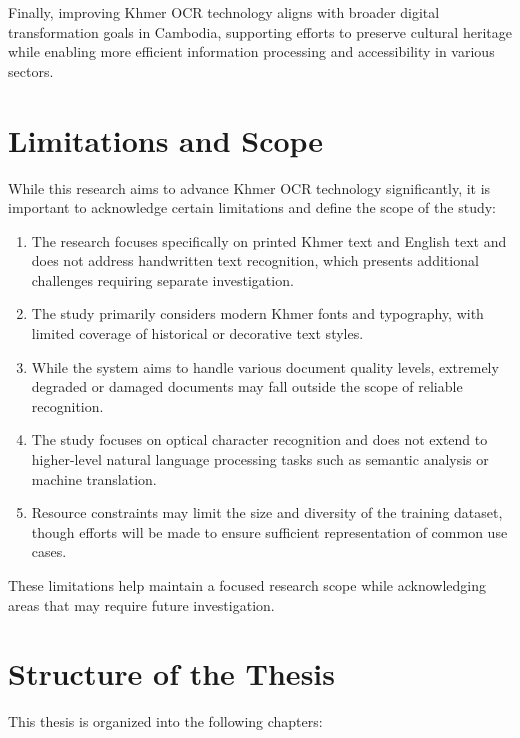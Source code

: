 Finally, improving Khmer OCR technology aligns with broader digital transformation goals in Cambodia, supporting efforts to preserve cultural heritage while enabling more efficient information processing and accessibility in various sectors.

\section{Limitations and Scope}
\label{sec:limitations}

While this research aims to advance Khmer OCR technology significantly, it is important to acknowledge certain limitations and define the scope of the study:

\begin{enumerate}
    \item The research focuses specifically on printed Khmer text and English text and does not address handwritten text recognition, which presents additional challenges requiring separate investigation.
    
    \item The study primarily considers modern Khmer fonts and typography, with limited coverage of historical or decorative text styles.
    
    \item While the system aims to handle various document quality levels, extremely degraded or damaged documents may fall outside the scope of reliable recognition.
    
    \item The study focuses on optical character recognition and does not extend to higher-level natural language processing tasks such as semantic analysis or machine translation.
    
    \item Resource constraints may limit the size and diversity of the training dataset, though efforts will be made to ensure sufficient representation of common use cases.
\end{enumerate}

These limitations help maintain a focused research scope while acknowledging areas that may require future investigation.

\section{Structure of the Thesis}
\label{sec:structure}

This thesis is organized into the following chapters:

